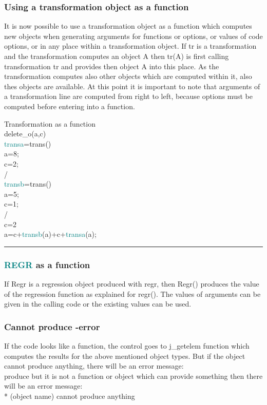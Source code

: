 {\subsubsection{Using a transformation object as a function} 
\label{transfunc} 
It is now possible to use a transformation object as a function which computes new 
objects when generating arguments for functions or options, 
or values of code options, or in any place within a transformation object. 
If {tr} is a transformation and the transformation computes an object {A} then 
{tr(A)} is first calling transformation {tr} and provides then object {A} into this place. 
As the transformation computes also other objects which are computed within it, also thes objects 
are available. At this point it is important to note that arguments of 
a transformation line are computed from right to left, because options must be computed before 
entering into a function. 
\singlespacing 
\begin{example}[transfunc]Transformation as a function\\ 
\label{transfunc} 
\noindent \textcolor{VioletRed}{delete\_o}(a,c)\\ 
\textcolor{teal}{transa}=\textcolor{VioletRed}{trans}()\\ 
a=8;\\ 
c=2;\\ 
/   \\ 
\textcolor{teal}{transb}=\textcolor{VioletRed}{trans}()\\ 
a=5;\\ 
c=1;\\ 
/   \\ 
c=2\\ 
a=c+\textcolor{teal}{transb}(a)+c+\textcolor{teal}{transa}(a);\\ 
\end{example} 
\vspace{-7mm} \rule{5cm}{0.1pt} 
\onehalfspacing 
\subsubsection{\textcolor{teal}{REGR} as a function} 
\label{regrfunc} 
If Regr is a regression object produced with regr, then Regr() produces 
the value of the regression function as explained for \textcolor{VioletRed}{regr}(). The values of arguments 
can be given in the calling code or the existing values can be used. 
\subsubsection{Cannot produce -error} 
\label{isnotfunc} 
If the code looks like a function, the control goes to j\_getelem function 
which computes the results for the above mentioned object types. But if 
the object cannot produce anything, there will be an error message:\\ 
produce   but it is not a function or object which can provide something then 
there will be an error message:\\ 
* (object name) cannot produce anything 
}

